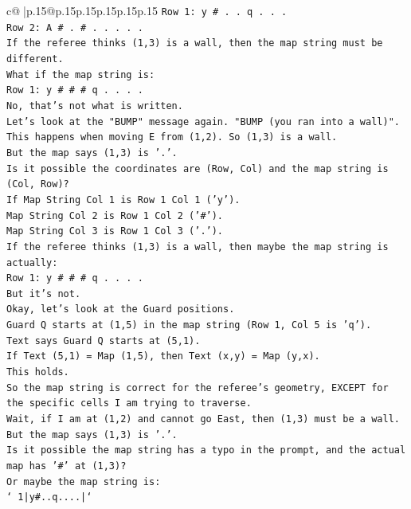 \documentclass{article}
\begin{document}
{\begin{supertabular}{c@{$\;$}|p{.15\linewidth}@{}p{.15\linewidth}p{.15\linewidth}p{.15\linewidth}p{.15\linewidth}p{.15\linewidth}}
{{{\texttt{Row 1: y \# . . q . . .} \\
\texttt{Row 2: A \# . \# . . . . .} \\
\texttt{If the referee thinks (1,3) is a wall, then the map string must be different.} \\
\texttt{What if the map string is:} \\
\texttt{Row 1: y \# \# \# q . . . .} \\
\texttt{No, that's not what is written.} \\
\texttt{Let's look at the "BUMP" message again. "BUMP (you ran into a wall)".} \\
\texttt{This happens when moving E from (1,2). So (1,3) is a wall.} \\
\texttt{But the map says (1,3) is '.'.} \\
\texttt{Is it possible the coordinates are (Row, Col) and the map string is (Col, Row)?} \\
\texttt{If Map String Col 1 is Row 1 Col 1 ('y').} \\
\texttt{Map String Col 2 is Row 1 Col 2 ('\#').} \\
\texttt{Map String Col 3 is Row 1 Col 3 ('.').} \\
\texttt{If the referee thinks (1,3) is a wall, then maybe the map string is actually:} \\
\texttt{Row 1: y \# \# \# q . . . .} \\
\texttt{But it's not.} \\
\texttt{Okay, let's look at the Guard positions.} \\
\texttt{Guard Q starts at (1,5) in the map string (Row 1, Col 5 is 'q').} \\
\texttt{Text says Guard Q starts at (5,1).} \\
\texttt{If Text (5,1) = Map (1,5), then Text (x,y) = Map (y,x).} \\
\texttt{This holds.} \\
\texttt{So the map string is correct for the referee's geometry, EXCEPT for the specific cells I am trying to traverse.} \\
\texttt{Wait, if I am at (1,2) and cannot go East, then (1,3) must be a wall.} \\
\texttt{But the map says (1,3) is '.'.} \\
\texttt{Is it possible the map string has a typo in the prompt, and the actual map has '\#' at (1,3)?} \\
\texttt{Or maybe the map string is:} \\
\texttt{` 1|y\#..q....|`} \\
}}}
\end{supertabular}}
\end{document}
